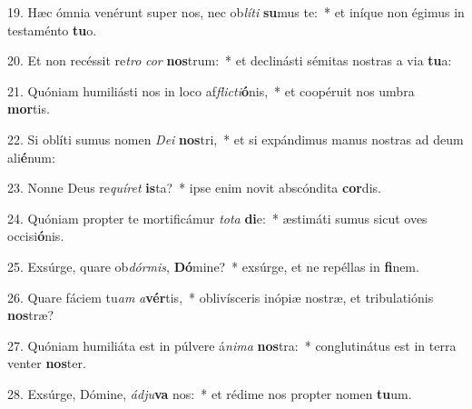 19. Hæc ómnia venérunt super nos, nec ob\textit{lí}\textit{ti} \textbf{su}mus te:~*  et iníque non égimus in testaménto \textbf{tu}o.\

20. Et non recéssit re\textit{tro} \textit{cor} \textbf{nos}trum:~*  et declinásti sémitas nostras a via \textbf{tu}a:\

21. Quóniam humiliásti nos in loco af\textit{flic}\textit{ti}\textbf{ó}nis,~*  et coopéruit nos umbra \textbf{mor}tis.\

22. Si oblíti sumus nomen \textit{De}\textit{i} \textbf{nos}tri,~*  et si expándimus manus nostras ad deum ali\textbf{é}num:\

23. Nonne Deus re\textit{quí}\textit{ret} \textbf{is}ta?~*  ipse enim novit abscóndita \textbf{cor}dis.\

24. Quóniam propter te mortificámur \textit{to}\textit{ta} \textbf{di}e:~*  æstimáti sumus sicut oves occisi\textbf{ó}nis.\

25. Exsúrge, quare ob\textit{dór}\textit{mis}, \textbf{Dó}mine?~*  exsúrge, et ne repéllas in \textbf{fi}nem.\

26. Quare fáciem tu\textit{am} \textit{a}\textbf{vér}tis,~*  oblivísceris inópiæ nostræ, et tribulatiónis \textbf{nos}træ?\

27. Quóniam humiliáta est in púlvere á\textit{ni}\textit{ma} \textbf{nos}tra:~*  conglutinátus est in terra venter \textbf{nos}ter.\

28. Exsúrge, Dómine, \textit{ád}\textit{ju}\textbf{va} nos:~*  et rédime nos propter nomen \textbf{tu}um.\

